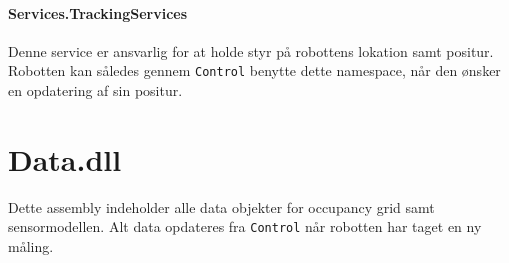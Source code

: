 \paragraph{Services.TrackingServices}
Denne service er ansvarlig for at holde styr på robottens lokation samt positur.
Robotten kan således gennem \lstinline[style=csharp]!Control! benytte dette namespace, når den ønsker en opdatering af sin positur.

\section{Data.dll}\label{arkitektur:data}
Dette assembly indeholder alle data objekter for occupancy grid samt sensormodellen.
Alt data opdateres fra \lstinline[style=csharp]!Control! når robotten har taget en ny måling.






